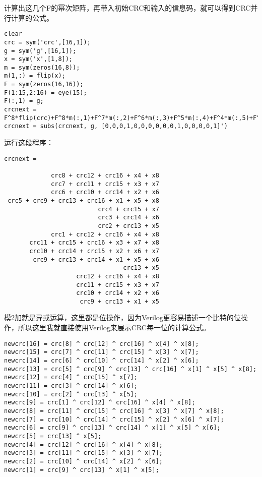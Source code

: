 \documentclass[
]{article}
\begin{document}
计算出这几个F的幂次矩阵，再带入初始CRC和输入的信息码，就可以得到CRC并行计算的公式。

\begin{lstlisting}[style={Matlab-style}]
% first input is x(8)
clear
crc = sym('crc',[16,1]);
g = sym('g',[16,1]);
x = sym('x',[1,8]);
m = sym(zeros(16,8));
m(1,:) = flip(x);
F = sym(zeros(16,16));
F(1:15,2:16) = eye(15);
F(:,1) = g;
crcnext = F^8*flip(crc)+F^8*m(:,1)+F^7*m(:,2)+F^6*m(:,3)+F^5*m(:,4)+F^4*m(:,5)+F^3*m(:,6)+F^2*m(:,7)+F*m(:,8);
crcnext = subs(crcnext, g, [0,0,0,1,0,0,0,0,0,0,1,0,0,0,0,1]')
\end{lstlisting}

运行这段程序：
\begin{verbatim}
crcnext =
 
             crc8 + crc12 + crc16 + x4 + x8
             crc7 + crc11 + crc15 + x3 + x7
             crc6 + crc10 + crc14 + x2 + x6
 crc5 + crc9 + crc13 + crc16 + x1 + x5 + x8
                          crc4 + crc15 + x7
                          crc3 + crc14 + x6
                          crc2 + crc13 + x5
             crc1 + crc12 + crc16 + x4 + x8
       crc11 + crc15 + crc16 + x3 + x7 + x8
       crc10 + crc14 + crc15 + x2 + x6 + x7
        crc9 + crc13 + crc14 + x1 + x5 + x6
                                 crc13 + x5
                    crc12 + crc16 + x4 + x8
                    crc11 + crc15 + x3 + x7
                    crc10 + crc14 + x2 + x6
                     crc9 + crc13 + x1 + x5
\end{verbatim}

模2加就是异或运算，这里都是位操作，因为Verilog更容易描述一个比特的位操作，所以这里我就直接使用Verilog来展示CRC每一位的计算公式。

\begin{lstlisting}[style={verilog-style}]
newcrc[16] = crc[8] ^ crc[12] ^ crc[16] ^ x[4] ^ x[8];
newcrc[15] = crc[7] ^ crc[11] ^ crc[15] ^ x[3] ^ x[7];
newcrc[14] = crc[6] ^ crc[10] ^ crc[14] ^ x[2] ^ x[6];
newcrc[13] = crc[5] ^ crc[9] ^ crc[13] ^ crc[16] ^ x[1] ^ x[5] ^ x[8];
newcrc[12] = crc[4] ^ crc[15] ^ x[7];
newcrc[11] = crc[3] ^ crc[14] ^ x[6];
newcrc[10] = crc[2] ^ crc[13] ^ x[5];
newcrc[9] = crc[1] ^ crc[12] ^ crc[16] ^ x[4] ^ x[8];
newcrc[8] = crc[11] ^ crc[15] ^ crc[16] ^ x[3] ^ x[7] ^ x[8];
newcrc[7] = crc[10] ^ crc[14] ^ crc[15] ^ x[2] ^ x[6] ^ x[7];
newcrc[6] = crc[9] ^ crc[13] ^ crc[14] ^ x[1] ^ x[5] ^ x[6];
newcrc[5] = crc[13] ^ x[5];
newcrc[4] = crc[12] ^ crc[16] ^ x[4] ^ x[8];
newcrc[3] = crc[11] ^ crc[15] ^ x[3] ^ x[7];
newcrc[2] = crc[10] ^ crc[14] ^ x[2] ^ x[6];
newcrc[1] = crc[9] ^ crc[13] ^ x[1] ^ x[5];
\end{lstlisting}
\end{document}
